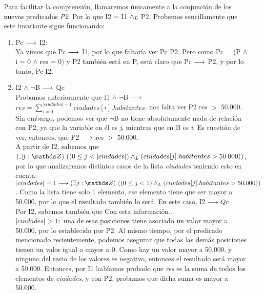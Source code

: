 \documentclass[10pt,a4paper]{article}
\begin{document}
    Para facilitar la comprensión, llamaremos únicamente a la conjunción de los nuevos predicados \textit{P2}. Por lo que I2 = I1 $\land _L$ P2. Probemos sencillamente que este invariante sigue funcionando:\\
\begin{enumerate} \setlength\itemsep{0cm}
\item Pc $\longrightarrow$ I2: \\

Ya vimos que Pc $\longrightarrow$ I1, por lo que faltaría ver Pc \implica P2. Pero como Pc = {(P $\wedge$ i = 0 $\wedge$ res = 0)} y P2 también está en P, está claro que Pc $\longrightarrow$ P2, y por lo tanto, Pc \implica I2.\\

\item I2 $\wedge$  $\neg$B $\longrightarrow$ Qc\\

Probamos anteriormente que I1 $\wedge$  $\neg$B $\longrightarrow$ $res = \sum\limits_{i=0}^{|ciudades| - 1}ciudades[i].habitantes$, nos falta ver P2 \implica res $>$ 50.000. Sin embargo, podemos ver que $\neg$B no tiene absolutamente nada de relación con P2, ya que la variable en él es \textit{j}, mientras que en B es \textit{i}. Es cuestión de ver, entonces, que P2 $\longrightarrow$ res $>$ 50.000.\\

A partir de I2, sabemos que $\existe[unalinea]{j}{\ent}{(0 \leq j < |ciudades|) \yLuego (ciudades[j].habitantes > 50.000)}$, por lo que analizaremos distintos casos de la lista \textit{ciudades} teniendo esto en cuenta:\\

$|ciudades| = 1 \implica \existe[unalinea]{j}{\ent}{(0 \leq j < 1) \yLuego (ciudades[j].habitantes > 50.000)}$. Como la lista tiene solo 1 elemento, ese elemento tiene que ser mayor a 50.000, por lo que el resultado también lo será. En este caso, I2 $\longrightarrow Qc$\\

Por I2, sabemos también que  Con esta información...\\

$|ciudades| > 1:$ una de esas posiciones tiene asociado un valor mayor a 50.000, por lo establecido por P2. Al mismo tiempo, por el predicado mencionado recientemente, podemos asegurar que todas las demás posiciones tienen un valor igual o mayor a 0. Como hay un valor mayor a 50.000, y ninguno del resto de los valores es negativo, entonces el resultado será mayor a 50.000. Entonces, por I1 habíamos probado que \textit{res} es la suma de todos los elementos de \textit{ciudades}, y con P2, probamos que dicha suma es mayor a 50.000.\\


\end{enumerate}
\end{document}

